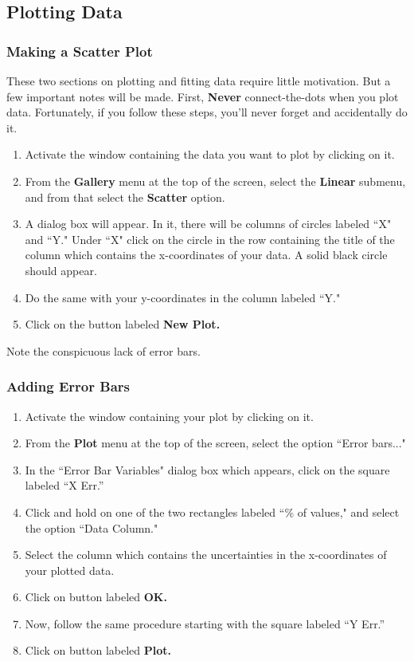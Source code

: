 \subsection{Plotting Data}

\subsubsection{Making a Scatter Plot}
These two sections on plotting and fitting data require little
motivation. But a few important notes will be made. First, {\bf Never}
connect-the-dots when you plot data.  Fortunately, if you follow these
steps, you'll never forget and accidentally do it.

\noindent
\begin{enumerate}
\item Activate the window containing the data you want to plot by clicking on it.
\item From the {\bf Gallery} menu at the top of the screen, select the {\bf Linear}
submenu, and from that select the {\bf Scatter} option.
\item A dialog box will appear. In it, there will be columns of circles labeled ``X"
and ``Y." Under ``X" click on the circle in the row containing the
title of the column which contains the x-coordinates of your data. A
solid black circle should appear.
\item Do the same with your y-coordinates in the column labeled ``Y."
\item Click on the button labeled {\bf New Plot.}
\end{enumerate}
\indent

Note the conspicuous lack of error bars.

\subsubsection{Adding Error Bars}

\noindent
\begin{enumerate}
\item Activate the window containing your plot by clicking on it.
\item From the {\bf Plot} menu at the top of the screen, select the option ``Error
bars..."
\item In the ``Error Bar Variables" dialog box which appears, click on the square
labeled ``X Err.''
\item Click and hold on one of the two rectangles labeled ``\% of values," and select
the option ``Data Column."
\item Select the column which contains the uncertainties in the x-coordinates of your
plotted data.
\item Click on button labeled {\bf OK.}
\item Now, follow the same procedure starting with the square labeled ``Y Err.''
\item Click on button labeled {\bf Plot.}
\end{enumerate}
\indent

